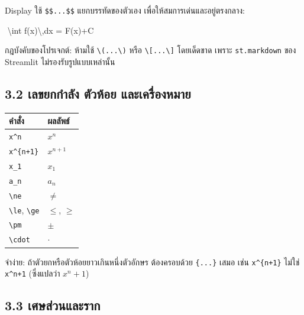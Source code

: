 \documentclass[
  thai,
  12pt,
  letterpaper,
  DIV=11,
  numbers=noendperiod]{scrartcl}
\newenvironment{Shaded}{\begin{snugshade}}{\end{snugshade}}
\newcommand{\NormalTok}[1]{\textcolor[rgb]{0.00,0.23,0.31}{#1}}
\newcounter{none} %
\begin{document}
Display ใช้ \texttt{\$\$...\$\$} แยกบรรทัดของตัวเอง
เพื่อให้สมการเด่นและอยู่ตรงกลาง:

\begin{Shaded}
\begin{Highlighting}[]
\NormalTok{$$}
\NormalTok{\textbackslash{}int f(x)\textbackslash{},dx = F(x)+C}
\NormalTok{$$}
\end{Highlighting}
\end{Shaded}

กฎบังคับของโปรเจกต์: ห้ามใช้ \texttt{\textbackslash{}(...\textbackslash{})}
หรือ \texttt{\textbackslash{}{[}...\textbackslash{}{]}} โดยเด็ดขาด เพราะ
\texttt{st.markdown} ของ Streamlit ไม่รองรับรูปแบบเหล่านั้น

\subsection{3.2 เลขยกกำลัง ตัวห้อย
และเครื่องหมาย}\label{uxe40uxe25uxe02uxe22uxe01uxe01uxe33uxe25uxe07-uxe15uxe27uxe2buxe2duxe22-uxe41uxe25uxe30uxe40uxe04uxe23uxe2duxe07uxe2buxe21uxe32uxe22}

{\def\LTcaptype{none} %
\begin{longtable}[]{@{}ll@{}}
\toprule\noalign{}
คำสั่ง & ผลลัพธ์ \\
\midrule\noalign{}
\endhead
\bottomrule\noalign{}
\endlastfoot
\texttt{x\^{}n} & \(x^n\) \\
\texttt{x\^{}\{n+1\}} & \(x^{n+1}\) \\
\texttt{x\_1} & \(x_1\) \\
\texttt{a\_n} & \(a_n\) \\
\texttt{\textbackslash{}ne} & \(\ne\) \\
\texttt{\textbackslash{}le}, \texttt{\textbackslash{}ge} & \(\le\),
\(\ge\) \\
\texttt{\textbackslash{}pm} & \(\pm\) \\
\texttt{\textbackslash{}cdot} & \(\cdot\) \\
\end{longtable}
}

จำง่าย: ถ้าตัวยกหรือตัวห้อยยาวเกินหนึ่งตัวอักษร ต้องครอบด้วย \texttt{\{...\}} เสมอ
เช่น \texttt{x\^{}\{n+1\}} ไม่ใช่ \texttt{x\^{}n+1} (ซึ่งแปลว่า \(x^n+1\))

\subsection{3.3
เศษส่วนและราก}\label{uxe40uxe28uxe29uxe2auxe27uxe19uxe41uxe25uxe30uxe23uxe32uxe01}
\end{document}
